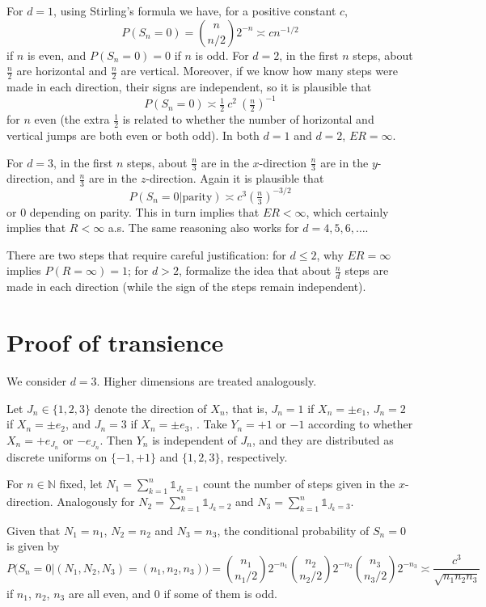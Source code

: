 \documentclass[a4paper,12pt]{article}
\theoremstyle{definition}
\newcommand{\I}{\mathds{1}}
\newcommand{\N}{\mathbb{N}}
\renewcommand{\le}{\leqslant}
\begin{document}
For $d=1$, using Stirling's formula we have, for a positive constant $c$,
\[
P(S_n=0) = \binom{n}{n/2} 2^{-n} \asymp c n^{-1/2}
\]
if $n$ is even, and $P(S_n=0) = 0$ if $n$ is odd.
For $d=2$, in the first $n$ steps, about $\frac{n}{2}$ are horizontal and $\frac{n}{2}$ are vertical.
Moreover, if we know how many steps were made in each direction, their signs are independent, so it is plausible that
\[
P(S_n=0) \asymp \tfrac{1}{2} \ c^2 \  (\tfrac{n}{2})^{-1}
\]
for $n$ even (the extra $\frac{1}{2}$ is related to whether the number of horizontal and vertical jumps are both even or both odd).
In both $d=1$ and $d=2$, $ER = \infty$.

For $d=3$, in the first $n$ steps, about $\frac{n}{3}$ are in the $x$-direction $\frac{n}{3}$ are in the $y$-direction, and $\frac{n}{3}$ are in the $z$-direction.
Again it is plausible that
\[
P(S_n=0|\text{parity}) \asymp c^3 (\tfrac{n}{3})^{-3/2}
\]
or $0$ depending on parity.
This in turn implies that $ER<\infty$, which certainly implies that $R<\infty$ a.s.
The same reasoning also works for $d=4,5,6,\dots$.

There are two steps that require careful justification: for $d \le 2$, why $ER=\infty$ implies
$P(R=\infty)=1$; for $d>2$, formalize the idea that about $\frac{n}{d}$ steps are made in each direction (while the sign of the steps remain independent).

\section{Proof of transience}

We consider $d=3$. Higher dimensions are treated analogously.

Let $J_n \in \{1,2,3\}$ denote the direction of $X_n$, that is, $J_n=1$ if $X_n = \pm e_1$, $J_n=2$ if $X_n = \pm e_2$, and $J_n=3$ if $X_n = \pm e_3$, .
Take $Y_n = +1$ or $-1$ according to whether $X_n = + e_{J_n}$ or $-e_{J_n}$.
Then $Y_n$ is independent of $J_n$, and they are distributed as discrete uniforms on $\{-1,+1\}$ and $\{1,2,3\}$, respectively.

For $n\in\N$ fixed, let $N_1 = \sum_{k=1}^n \I_{J_k=1}$ count the number of steps given in the $x$-direction.
Analogously for $N_2 = \sum_{k=1}^n \I_{J_k=2}$ and $N_3 = \sum_{k=1}^n \I_{J_k=3}$.

Given that $N_1=n_1$, $N_2=n_2$ and $N_3=n_3$, the conditional probability of $S_n=0$ is given by
\[
P\big(S_n=0\big|(N_1,N_2,N_3)=(n_1,n_2,n_3)\big) =
\textstyle
\binom{n_1}{n_1/2} 2^{-n_1}
\binom{n_2}{n_2/2} 2^{-n_2}
\binom{n_3}{n_3/2} 2^{-n_3}
\asymp
\frac{c^3}{\sqrt{n_1 n_2 n_3}}
\]
if $n_1$, $n_2$, $n_3$ are all even, and $0$ if some of them is odd.
\end{document}
